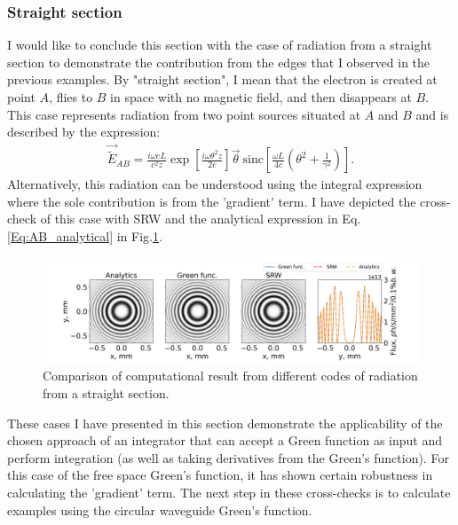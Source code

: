 \subsubsection{Straight section}
    I would like to conclude this section with the case of radiation from a straight section to demonstrate the contribution from the edges that I observed in the previous examples. By "straight section", I mean that the electron is created at point $A$, flies to $B$ in space with no magnetic field, and then disappears at $B$. This case represents radiation from two point sources situated at $A$ and $B$ and is described by the expression:   
    \begin{align}
        \vec{\widetilde{E}}_{AB}=\frac{ i \omega e L}{c^2 z}
        \exp\left[\frac{i \omega \theta^2 z}{2 c}\right] \vec{\theta} ~
        \mathrm{sinc}\left[\frac{\omega L}{4
        c}\left(\theta^2+\frac{1}{\gamma^2}\right)\right].
        \label{Eq:AB_analytical}    
    \end{align}
   Alternatively, this radiation can be understood using the integral expression where the sole contribution is from the 'gradient' term. I have depicted the cross-check of this case with SRW and the analytical expression in Eq.\ref{Eq:AB_analytical} in Fig.\ref{Fig:AB}.
    \begin{figure}[h!]
    	\centering
        \includegraphics[width=0.99\linewidth]{content/images/5_THz_Source/AB.png}
        \captionsetup{justification=centering}
        \caption{Comparison of computational result from different codes of radiation from a straight section.}
        \label{Fig:AB}
    \end{figure}
    
    These cases I have presented in this section demonstrate the applicability of the chosen approach of an integrator that can accept a Green function as input and perform integration (as well as taking derivatives from the Green's function). For this case of the free space Green's function, it has shown certain robustness in calculating the 'gradient' term. The next step in these cross-checks is to calculate examples using the circular waveguide Green's function.
    
